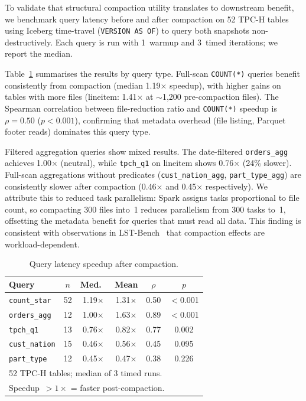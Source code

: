 \documentclass[conference, 10pt]{IEEEtran}
\begin{document}
To validate that structural compaction utility translates to
downstream benefit, we benchmark query latency before and after
compaction on 52 TPC-H tables using Iceberg time-travel
(\texttt{VERSION AS OF}) to query both snapshots non-destructively.
Each query is run with 1~warmup and 3~timed iterations; we report
the median.

Table~\ref{tab:querybench} summarises the results by query type.
Full-scan \texttt{COUNT(*)} queries benefit consistently from
compaction (median 1.19$\times$ speedup), with higher gains on
tables with more files (lineitem: 1.41$\times$ at $\sim$1{,}200
pre-compaction files). The Spearman correlation between
file-reduction ratio and \texttt{COUNT(*)} speedup is
$\rho = 0.50$ ($p < 0.001$), confirming that metadata overhead
(file listing, Parquet footer reads) dominates this query type.

Filtered aggregation queries show mixed results. The date-filtered
\texttt{orders\_agg} achieves 1.00$\times$ (neutral), while
\texttt{tpch\_q1} on lineitem shows 0.76$\times$ (24\% slower).
Full-scan aggregations without predicates
(\texttt{cust\_nation\_agg}, \texttt{part\_type\_agg}) are
consistently slower after compaction (0.46$\times$ and
0.45$\times$ respectively). We attribute this to reduced task
parallelism: Spark assigns tasks proportional to file count, so
compacting 300 files into~1 reduces parallelism from 300 tasks
to~1, offsetting the metadata benefit for queries that must read
all data. This finding is consistent with observations in
LST-Bench~\cite{camachorodriguez2024lstbench} that compaction
effects are workload-dependent.

\begin{table}[tb]
\setlength{\abovecaptionskip}{4pt}
\setlength{\belowcaptionskip}{-4pt}
\centering
\caption{Query latency speedup after compaction.}
\label{tab:querybench}
\begin{tabular}{lccccc}
\toprule
Query & $n$ & Med.\ & Mean & $\rho$ & $p$ \\
\midrule
\texttt{count\_star}    & 52 & 1.19$\times$ & 1.31$\times$ & 0.50 & $<$0.001 \\
\texttt{orders\_agg}    & 12 & 1.00$\times$ & 1.63$\times$ & 0.89 & $<$0.001 \\
\texttt{tpch\_q1}       & 13 & 0.76$\times$ & 0.82$\times$ & 0.77 & 0.002 \\
\texttt{cust\_nation}   & 15 & 0.46$\times$ & 0.56$\times$ & 0.45 & 0.095 \\
\texttt{part\_type}     & 12 & 0.45$\times$ & 0.47$\times$ & 0.38 & 0.226 \\
\bottomrule
\multicolumn{6}{l}{\scriptsize 52 TPC-H tables; median of 3 timed runs.} \\
\multicolumn{6}{l}{\scriptsize Speedup~$> 1{\times}$ = faster post-compaction.} \\
\end{tabular}
\end{table}
\end{document}
